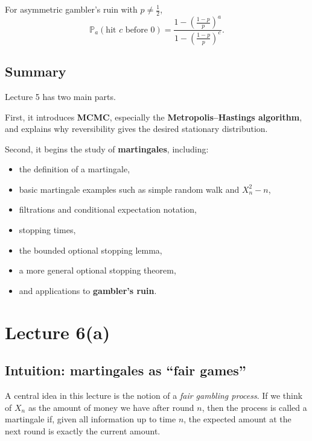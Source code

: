 \documentclass[11pt]{article}
\theoremstyle{definition}
\begin{document}
\begin{keyformula}
For asymmetric gambler's ruin with \(p\neq \tfrac12\),
\[
\mathbb P_a(\text{hit } c \text{ before } 0)
=
\frac{1-\left(\frac{1-p}{p}\right)^a}
{1-\left(\frac{1-p}{p}\right)^c}.
\]
\end{keyformula}

\subsection{Summary}

\begin{summarybox}
Lecture 5 has two main parts.

First, it introduces \textbf{MCMC}, especially the \textbf{Metropolis--Hastings algorithm}, and explains why reversibility gives the desired stationary distribution.

Second, it begins the study of \textbf{martingales}, including:
\begin{itemize}[leftmargin=2em]
    \item the definition of a martingale,
    \item basic martingale examples such as simple random walk and \(X_n^2-n\),
    \item filtrations and conditional expectation notation,
    \item stopping times,
    \item the bounded optional stopping lemma,
    \item a more general optional stopping theorem,
    \item and applications to \textbf{gambler's ruin}.
\end{itemize}
\end{summarybox}

\clearpage
\section{Lecture 6(a)}

\subsection{Intuition: martingales as ``fair games''}

A central idea in this lecture is the notion of a \emph{fair gambling process}.
If we think of \(X_n\) as the amount of money we have after round \(n\), then the process is called a martingale if, given all information up to time \(n\), the expected amount at the next round is exactly the current amount.
\end{document}
